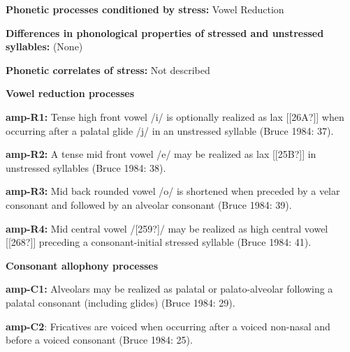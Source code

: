 \begin{styleBody}
\textbf{Phonetic processes conditioned by stress:} Vowel Reduction
\end{styleBody}

\begin{styleBody}
\textbf{Differences in phonological properties of stressed and unstressed syllables:} (None)
\end{styleBody}

\begin{styleBody}
\textbf{Phonetic correlates of stress: }Not described
\end{styleBody}

\begin{styleBody}
\textbf{Vowel reduction processes}
\end{styleBody}

\begin{styleBody}
\textbf{amp-R1:} Tense high front vowel /i/ is optionally realized as lax [[26A?]] when occurring after a palatal glide /j/ in an unstressed syllable (Bruce 1984: 37).
\end{styleBody}

\begin{styleBody}
\textbf{amp-R2:} A tense mid front vowel /e/ may be realized as lax [[25B?]] in unstressed syllables (Bruce 1984: 38).
\end{styleBody}

\begin{styleBody}
\textbf{amp-R3:} Mid back rounded vowel /o/ is shortened when preceded by a velar consonant and followed by an alveolar consonant (Bruce 1984: 39).
\end{styleBody}

\begin{styleBody}
\textbf{amp-R4:} Mid central vowel /[259?]/ may be realized as high central vowel [[268?]] preceding a consonant-initial stressed syllable (Bruce 1984: 41).
\end{styleBody}

\begin{styleBody}
\textbf{Consonant allophony processes}
\end{styleBody}

\begin{styleBody}
\textbf{amp-C1: }Alveolars may be realized as palatal or palato-alveolar following a palatal consonant (including glides) (Bruce 1984: 29).
\end{styleBody}

\begin{styleBody}
\textbf{amp-C2}: Fricatives are voiced when occurring after a voiced non-nasal and before a voiced consonant (Bruce 1984: 25).
\end{styleBody}

